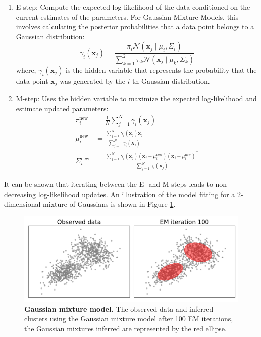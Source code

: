 \begin{enumerate}
    \item E-step: Compute the expected log-likelihood of the data conditioned on the current estimates of the parameters. For Gaussian Mixture Models, this involves calculating the posterior probabilities that a data point belongs to a Gaussian distribution:
    \begin{equation}
        \gamma_{i}(\mathbf{x}_j) = \frac{\pi_i \mathcal{N}(\mathbf{x}_j \mid \mu_i, \Sigma_i)}{\sum_{k=1}^{2} \pi_k \mathcal{N}(\mathbf{x}_j \mid \mu_k, \Sigma_k)}
    \end{equation}
    where, $\gamma_{i}(\mathbf{x}_j)$ is the hidden variable that represents the probability that the data point $\mathbf{x}_j$ was generated by the $i$-th Gaussian distribution. 
    \item M-step: Uses the hidden variable to maximize the expected log-likelihood and estimate updated parameters:
    \begin{align}
        \pi_i^{\text{new}} &= \frac{1}{N} \sum_{j=1}^{N} \gamma_{i}(\mathbf{x}_j)  \nonumber \\
        \mu_i^{\text{new}} &= \frac{\sum_{j=1}^{N} \gamma_{i}(\mathbf{x}_j) \mathbf{x}_j}{\sum_{j=1}^{N} \gamma_{i}(\mathbf{x}_j)} \nonumber \\
        \Sigma_i^{\text{new}} &= \frac{\sum_{j=1}^{N} \gamma_{i}(\mathbf{x}_j) (\mathbf{x}_j - \mu_i^{\text{new}})(\mathbf{x}_j - \mu_i^{\text{new}})^\top}{\sum_{j=1}^{N} \gamma_{i}(\mathbf{x}_j)}
    \end{align}
\end{enumerate}

It can be shown that iterating between the E- and M-steps leads to non-decreasing log-likelihood updates. An illustration of the model fitting for a 2-dimensional mixture of Gaussians is shown in Figure \ref{fig:gb-gmm-visualize}.

\begin{figure}
    \centering
    \includegraphics[width=\textwidth]{figures/gmm_visualize.pdf}
    \caption{\textbf{Gaussian mixture model.} The observed data and inferred clusters using the Gaussian mixture model after 100 EM iterations, the Gaussian mixtures inferred are represented by the red ellipse.}
    \label{fig:gb-gmm-visualize}
\end{figure}

